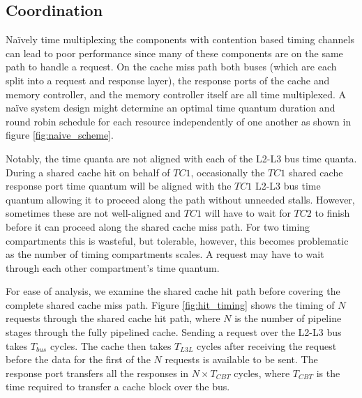 \subsection{Coordination}
Naïvely time multiplexing the components with contention based timing channels 
can lead to poor performance since many of these components are on the same 
path to handle a request. 
On the cache miss path both buses (which are each split into a request and 
response layer), the response ports of the cache and memory controller, and the 
memory controller itself are all time multiplexed. A naïve system design might 
determine an optimal time quantum duration and round robin schedule for each 
resource independently of one another as shown in figure 
\ref{fig:naive_scheme}.

Notably, the time quanta are not aligned with each of the L2-L3 bus time 
quanta.  During a shared cache hit on behalf of $TC1$, occasionally the $TC1$ 
shared cache response port time quantum will be aligned with the $TC1$ L2-L3 
bus time quantum allowing it to proceed along the path without unneeded stalls.  
However, sometimes these are not well-aligned and $TC1$ will have to wait for 
$TC2$ to finish before it can proceed along the shared cache miss path. For two 
timing compartments this is wasteful, but tolerable, however, this becomes 
problematic as the number of timing compartments scales. A request may have to 
wait through each other compartment's time quantum. 

For ease of analysis, we examine the shared cache hit path before covering the 
complete shared cache miss path. Figure \ref{fig:hit_timing} shows the timing 
of $N$ requests through the shared cache hit path, where $N$ is the number of 
pipeline stages through the fully pipelined cache. Sending a request over the 
L2-L3 bus takes $T_{bus}$ cycles.  The cache then takes $T_{L3L}$ cycles after 
receiving the request before the data for the first of the $N$ requests is 
available to be sent. The response port transfers all the responses in $N\times 
T_{CBT}$ cycles, where $T_{CBT}$ is the time required to transfer a cache block 
over the bus.

